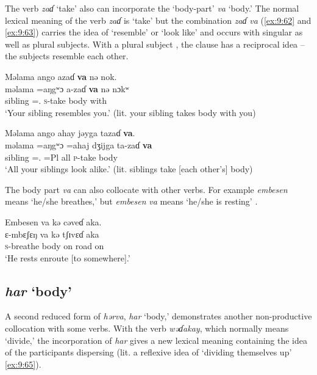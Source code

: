 The verb \textit{zaɗ}  ‘take’ also can incorporate the ‘body-part’ \textit{va}  ‘body.’ The normal lexical meaning of the verb \textit{zaɗ}  is ‘take’ but the combination \textit{zaɗ} \textit{va} (\ref{ex:9:62} and \ref{ex:9:63}) carries the idea of ‘resemble’ or ‘look like’ and occurs with singular as well as plural subjects. With a plural subject , the clause has a reciprocal idea -- the subjects resemble each other. 

\ea \label{ex:9:62}
Məlama  ango  azaɗ  \textbf{va}  nə  nok.\\
\gll  məlama   =aŋgʷɔ     a-zaɗ   \textbf{va}  nə  nɔkʷ\\
      sibling  ={\twoS}.{\POSS}  \textsc{s}-take  body  with  {\twoS}\\
\glt  ‘Your sibling resembles you.’ (lit. your sibling takes body with you)
\z

\ea \label{ex:9:63}
Məlama  ango ahay  jəyga  tazaɗ  \textbf{va}.\\
\gll  məlama   =aŋgʷɔ     =ahaj   dʒijga   ta-zaɗ   \textbf{va}\\
      sibling  ={\twoS}.{\POSS}  =Pl  all  \textsc{p}-take  body\\
\glt  ‘All your siblings look alike.’ (lit. siblings take [each other’s] body)
\z

The body part \textit{va} can also collocate with other verbs. For example \textit{e{}mbesen} means ‘he/she breathes,’ but \textit{e{}mbesen} \textit{va} means ‘he/she is resting’ .

\ea \label{ex:9:64}
Embesen  va  kə  cəveɗ  aka.\\
\gll  ɛ{}-mbɛʃɛŋ  va  kə  tʃɪvɛɗ  aka\\
      \textsc{s}-breathe  body  on  road  on\\
\glt  ‘He rests enroute [to somewhere].’
\z

\subsection{\textit{har} ‘body’}\label{sec:9.3.5}\label{sec:9.3.1.5}

A second reduced form of \textit{hərva}, \textit{har} ‘body,’ demonstrates another non-productive collocation with some verbs. With the verb \textit{wəɗakay}, which normally means ‘divide,’ the incorporation of \textit{har} gives a new lexical meaning containing the idea of the participants dispersing (lit. a reflexive idea of ‘dividing themselves up’ \ref{ex:9:65}). 

